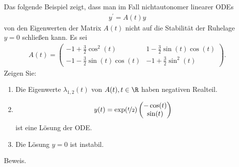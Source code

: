 \begin{exercise}
Das folgende Beispiel zeigt, dass man im Fall nichtautonomer linearer ODEs
\begin{align*}
  y^{\prime} = A(t)y
\end{align*}
von den Eigenwerten der Matrix $A(t)$ nicht auf die Stabilität der Ruhelage $y = 0$
schließen kann. Es sei
\begin{align*}
  A(t) = \begin{pmatrix}
    -1 + \frac{3}{2}\cos^2(t) & 1 -\frac{3}{2}\sin(t)\cos(t) \\
    -1 - \frac{3}{2}\sin(t)\cos(t) & -1 + \frac{3}{2}\sin^2(t)
  \end{pmatrix}.
\end{align*}
Zeigen Sie:
\begin{enumerate}[label = \textbf{\alph*)}]
  \item Die Eigenwerte $\lambda_{1,2}(t)$ von $A(t), t \in \R$ haben negativen Realteil.
  \item
  \begin{align*}
    y(t) = \exp(\nicefrac{t}{2})\begin{pmatrix}
      -\cos(t) \\ \sin(t)
    \end{pmatrix}
  \end{align*}
  ist eine Lösung der ODE.
  \item Die Lösung $y = 0$ ist instabil.
\end{enumerate}
\end{exercise}
\begin{solution}
Beweis.
\end{solution}
